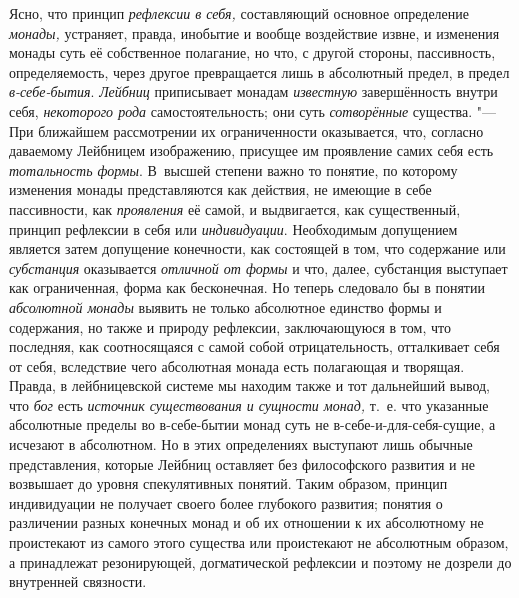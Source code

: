 Ясно, что принцип {\em рефлексии в себя,} составляющий
основное определение {\em монады,} устраняет, правда,
инобытие и вообще воздействие извне, и изменения монады суть её собственное
полагание, но что, с другой стороны, пассивность, определяемость, через
другое превращается лишь в абсолютный предел, в предел
{\em в-себе-бытия}. {\em Лейбниц}
приписывает монадам {\em известную} завершённость
внутри себя, {\em некоторого рода} самостоятельность;
они суть {\em сотворённые} существа. "--- При ближайшем
рассмотрении их ограниченности оказывается, что, согласно даваемому
Лейбницем изображению, присущее им проявление самих себя есть
{\em тотальность формы}. В~высшей степени важно то
понятие, по которому изменения монады представляются как действия, не
имеющие в себе пассивности, как {\em проявления} её
самой, и выдвигается, как существенный, принцип рефлексии в себя или
{\em индивидуации}. Необходимым допущением является
затем допущение конечности, как состоящей в том, что содержание или
{\em субстанция} оказывается {\em отличной от формы} и что, далее, субстанция
выступает как ограниченная, форма как бесконечная. Но теперь следовало бы в
понятии {\em абсолютной монады} выявить не только
абсолютное единство формы и содержания, но также и природу рефлексии,
заключающуюся в том, что последняя, как соотносящаяся с самой собой
отрицательность, отталкивает себя от себя, вследствие чего абсолютная
монада есть полагающая и творящая. Правда, в лейбницевской системе мы
находим также и тот дальнейший вывод, что {\em бог}
есть {\em источник существования и сущности монад,}
т.~е. что указанные абсолютные пределы во в-себе-бытии монад суть не
в-себе-и-для-себя-сущие, а исчезают в абсолютном. Но в этих определениях
выступают лишь обычные представления, которые Лейбниц оставляет без
философского развития и не возвышает до уровня спекулятивных понятий. Таким
образом, принцип индивидуации не получает своего более глубокого развития;
понятия о различении разных конечных монад и об их отношении к их
абсолютному не проистекают из самого этого существа или проистекают не
абсолютным образом, а принадлежат резонирующей, догматической рефлексии и
поэтому не дозрели до внутренней связности.

